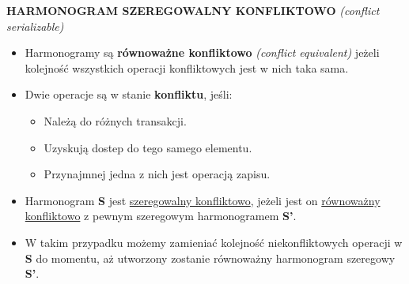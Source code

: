 \documentclass[a5paper,6pt]{article}
\begin{document}
    \textbf{HARMONOGRAM SZEREGOWALNY KONFLIKTOWO}
    \textit{(conflict serializable)}
    \begin{itemize}
        \item Harmonogramy są \textbf{równoważne konfliktowo}
              \textit{(conflict equivalent)} jeżeli kolejność wszystkich
              operacji konfliktowych jest w nich taka sama.
        \item Dwie operacje są w stanie \textbf{konfliktu}, jeśli:
        \begin{itemize}
            \item Należą do różnych transakcji.
            \item Uzyskują dostep do tego samego elementu.
            \item Przynajmnej jedna z nich jest operacją zapisu.
        \end{itemize}

        \item Harmonogram \textbf{S} jest \underline{szeregowalny konfliktowo},
        jeżeli jest on \underline{równoważny} \underline{konfliktowo} z pewnym
        szeregowym harmonogramem \textbf{S'}.
        \item W takim przypadku możemy zamieniać kolejność niekonfliktowych
        operacji w \textbf{S} do momentu, aż utworzony zostanie równoważny
        harmonogram szeregowy \textbf{S'}.
    \end{itemize}
\end{document}
